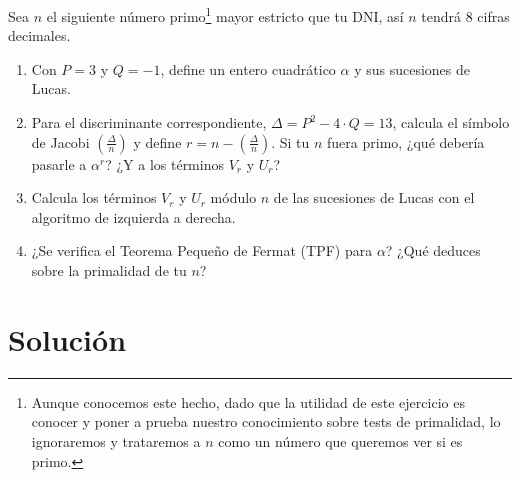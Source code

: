 	Sea $n$ el siguiente número primo\footnote{Aunque conocemos este hecho, dado que la utilidad de este ejercicio
	es conocer y poner a prueba nuestro conocimiento sobre tests de primalidad, lo ignoraremos y trataremos a $n$
	como un número que queremos ver si es primo.} mayor estricto que tu DNI, así $n$ tendrá 8 cifras decimales.
	\begin{enumerate}
		\item Con $P = 3$ y $Q = -1$, define un entero cuadrático $\alpha$ y sus sucesiones de Lucas.
		\item Para el discriminante correspondiente, $\Delta = P^2 - 4 \cdot Q = 13$, calcula el símbolo de Jacobi
		$\displaystyle \left(\frac{\Delta}{n}\right)$ y define $\displaystyle r = n - \left(\frac{\Delta}{n}\right)$.
		Si tu $n$ fuera primo, ¿qué debería pasarle a $\alpha^r$? ¿Y a los términos $V_r$ y $U_r$?
		\item Calcula los términos $V_r$ y $U_r$ módulo $n$ de las sucesiones de Lucas con el algoritmo de izquierda
		a derecha.
		\item ¿Se verifica el Teorema Pequeño de Fermat (TPF) para $\alpha$? ¿Qué deduces sobre la primalidad de
		tu $n$?
	\end{enumerate}

\section*{Solución}
